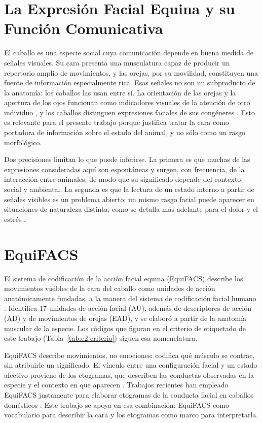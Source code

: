 
\section{La Expresión Facial Equina y su Función Comunicativa}
El caballo es una especie social cuya comunicación depende en buena medida de señales visuales. Su cara presenta una musculatura capaz de producir un repertorio amplio de movimientos, y las orejas, por su movilidad, constituyen una fuente de información especialmente rica. Esas señales no son un subproducto de la anatomía: los caballos las usan entre sí. La orientación de las orejas y la apertura de los ojos funcionan como indicadores visuales de la atención de otro individuo \parencite{wathan2014}, y los caballos distinguen expresiones faciales de sus congéneres \parencite{wathan2016}. Esto es relevante para el presente trabajo porque justifica tratar la cara como portadora de información sobre el estado del animal, y no sólo como un rasgo morfológico.

Dos precisiones limitan lo que puede inferirse. La primera es que muchas de las expresiones consideradas aquí son espontáneas y surgen, con frecuencia, de la interacción entre animales, de modo que su significado depende del contexto social y ambiental. La segunda es que la lectura de un estado interno a partir de señales visibles es un problema abierto: un mismo rasgo facial puede aparecer en situaciones de naturaleza distinta, como se detalla más adelante para el dolor y el estrés \parencite{lundblad2021,torcivia2021}.

\section{EquiFACS}
El sistema de codificación de la acción facial equina (EquiFACS) describe los movimientos visibles de la cara del caballo como unidades de acción anatómicamente fundadas, a la manera del sistema de codificación facial humano \parencite{wathan2015}. Identifica 17 unidades de acción facial (AU), además de descriptores de acción (AD) y de movimientos de orejas (EAD), y se elaboró a partir de la anatomía muscular de la especie. Los códigos que figuran en el criterio de etiquetado de este trabajo (Tabla~\ref{tab:c2-criterio}) siguen esa nomenclatura.

EquiFACS describe movimientos, no emociones: codifica qué músculo se contrae, sin atribuirle un significado. El vínculo entre una configuración facial y un estado afectivo proviene de los etogramas, que describen las conductas observadas en la especie y el contexto en que aparecen \parencite{waring1983,mcdonnell2002,mullard2017,torresborda2024,lewis2025}. Trabajos recientes han empleado EquiFACS justamente para elaborar etogramas de la conducta facial en caballos domésticos \parencite{lewis2025}. Este trabajo se apoya en esa combinación: EquiFACS como vocabulario para describir la cara y los etogramas como marco para interpretarla.

